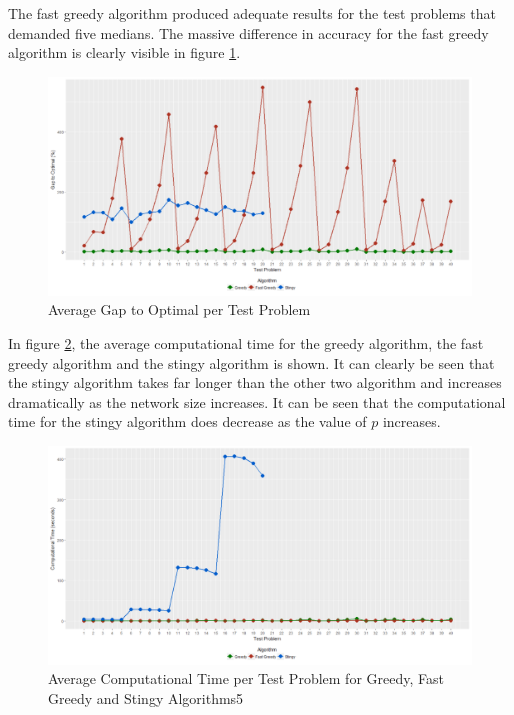 \documentclass[11pt]{article}
\begin{document}
	The fast greedy algorithm produced adequate results for the test problems that demanded five medians.  The massive difference in accuracy for the fast greedy algorithm is clearly visible in figure \ref{CH.av.acc}.
	
	\begin{figure}[H]
		\begin{center}
			\includegraphics[width=14cm]{CHavacc.png}
			\caption{Average Gap to Optimal per Test Problem}
			\label{CH.av.acc}
		\end{center}
	\end{figure}

	In figure \ref{CH.av.time}, the average computational time for the greedy algorithm, the fast greedy algorithm and the stingy algorithm is shown.  It can clearly be seen that the stingy algorithm takes far longer than the other two algorithm and increases dramatically as the network size increases.  It can be seen that the computational time for the stingy algorithm does decrease as the value of $p$ increases.
	
	\begin{figure}[H]
		\begin{center}
			\includegraphics[width=14cm]{CHavtime1.png}
			\caption{Average Computational Time per Test Problem for Greedy, Fast Greedy and Stingy Algorithms5}
			\label{CH.av.time}
		\end{center}
	\end{figure}
	
\end{document}
